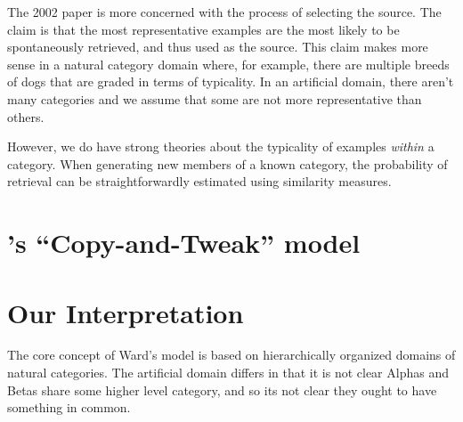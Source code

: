 \documentclass[12pt]{article}
\begin{document}
The 2002 paper is more concerned with the process of selecting the source. The claim is that the most representative examples are the most likely to be spontaneously retrieved, and thus used as the source. This claim makes more sense in a natural category domain where, for example, there are multiple breeds of dogs that are graded in terms of typicality. In an artificial domain, there aren't many categories and we assume that some are not more representative than others. 

However, we do have strong theories about the typicality of examples \textit{within} a category. When generating new members of a known category, the probability of retrieval can be straightforwardly estimated using similarity measures.




\section{\citeauthor{jern2013probabilistic}'s ``Copy-and-Tweak'' model}





\section{Our Interpretation}

The core concept of Ward's model is based on hierarchically organized domains of natural categories. The artificial domain differs in that it is not clear Alphas and Betas share some higher level category, and so its not clear they ought to have something in common. 




\clearpage


\clearpage
\end{document}

